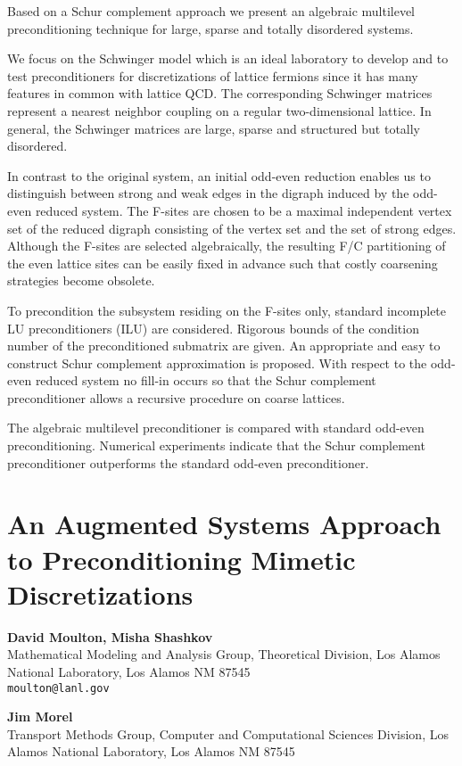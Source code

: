 \documentclass[11pt]{article}
\newcommand{\nextab}[4]{
	\section{#2}
	{\bf #1} \\ \nopagebreak
	{#3} \\ \nopagebreak
	{\tt #4} \nopagebreak
	}
\begin{document}
Based on a Schur complement approach we present an algebraic multilevel
preconditioning technique for large, sparse and totally disordered systems.


We focus on the Schwinger model which is an ideal laboratory to
develop and to test preconditioners for discretizations of lattice
fermions since it has many features in common with lattice QCD. The
corresponding Schwinger matrices represent a nearest neighbor coupling
on a regular two-dimensional lattice. In general, the Schwinger matrices
are large, sparse and structured but totally disordered.



In contrast to the original system, an initial odd-even reduction enables us
to distinguish between strong and weak edges in the digraph induced by the
odd-even reduced system. The F-sites are chosen to be a maximal independent
vertex set of the reduced digraph consisting of the vertex set and the set
of strong edges.  Although the F-sites are selected algebraically,
the resulting F/C partitioning of the even lattice sites can be easily fixed
in advance such that costly coarsening strategies become obsolete.



To precondition the subsystem residing on the F-sites only,
standard incomplete LU preconditioners (ILU) are considered.
Rigorous bounds of the condition number of the preconditioned
submatrix are given. An appropriate and easy to construct Schur
complement approximation is proposed. With respect to the
odd-even reduced system no fill-in occurs so that the Schur
complement preconditioner allows a recursive procedure on coarse
lattices.


The algebraic multilevel preconditioner is compared with standard
odd-even preconditioning. Numerical experiments indicate that the
Schur complement preconditioner outperforms the standard odd-even
preconditioner.



\nextab
{David Moulton, Misha Shashkov}
{An Augmented Systems Approach to Preconditioning Mimetic Discretizations}
{Mathematical Modeling and Analysis Group, Theoretical Division, Los Alamos National Laboratory, Los Alamos NM 87545}
{moulton@lanl.gov}

{\bf Jim Morel} \\
Transport Methods Group,
Computer and Computational Sciences Division,
Los Alamos National Laboratory,
Los Alamos NM 87545
\end{document}
